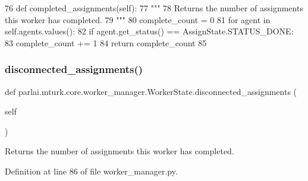 \begin{DoxyCode}
76     \textcolor{keyword}{def }completed\_assignments(self):
77         \textcolor{stringliteral}{"""}
78 \textcolor{stringliteral}{        Returns the number of assignments this worker has completed.}
79 \textcolor{stringliteral}{        """}
80         complete\_count = 0
81         \textcolor{keywordflow}{for} agent \textcolor{keywordflow}{in} self.agents.values():
82             \textcolor{keywordflow}{if} agent.get\_status() == AssignState.STATUS\_DONE:
83                 complete\_count += 1
84         \textcolor{keywordflow}{return} complete\_count
85 
\end{DoxyCode}
\mbox{\label{classparlai_1_1mturk_1_1core_1_1worker__manager_1_1WorkerState_a0cfe653c2c2df23393da636c3106a3de}} 
\subsubsection{\texorpdfstring{disconnected\+\_\+assignments()}{disconnected\_assignments()}}
{\footnotesize\ttfamily def parlai.\+mturk.\+core.\+worker\+\_\+manager.\+Worker\+State.\+disconnected\+\_\+assignments (\begin{DoxyParamCaption}\item[{}]{self }\end{DoxyParamCaption})}

\begin{DoxyVerb}Returns the number of assignments this worker has completed.
\end{DoxyVerb}
 

Definition at line 86 of file worker\+\_\+manager.\+py.


